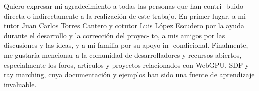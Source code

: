        \vspace{1cm}


Quiero expresar mi agradecimiento a todas las personas que han contri-
buido directa o indirectamente a la realización de este trabajo.
En primer lugar, a mi tutor Juan Carlos Torres Cantero y cotutor Luis
López Escudero por la ayuda durante el desarrollo y la corrección del proyec-
to, a mis amigos por las discusiones y las ideas, y a mi familia por su apoyo in-
condicional.
\bigbreak
Finalmente, me gustaría mencionar a la comunidad de desarrolladores y
recursos abiertos, especialmente los foros, artículos y proyectos relacionados
con WebGPU, SDF y ray marching, cuya documentación y ejemplos han
sido una fuente de aprendizaje invaluable.